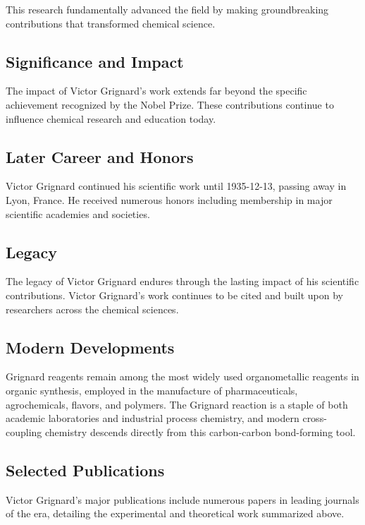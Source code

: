 This research fundamentally advanced the field by making groundbreaking contributions that transformed chemical science.

\subsection*{Significance and Impact}

The impact of Victor Grignard's work extends far beyond the specific achievement recognized by the Nobel Prize.
These contributions continue to influence chemical research and education today.

\subsection*{Later Career and Honors}

Victor Grignard continued his scientific work until 1935-12-13, passing away in Lyon, France.
He received numerous honors including membership in major scientific academies and societies.

\subsection*{Legacy}

The legacy of Victor Grignard endures through the lasting impact of his scientific contributions.
Victor Grignard's work continues to be cited and built upon by researchers across the chemical sciences.

\subsection*{Modern Developments}

Grignard reagents remain among the most widely used organometallic reagents in organic synthesis, employed in the manufacture of pharmaceuticals, agrochemicals, flavors, and polymers. The Grignard reaction is a staple of both academic laboratories and industrial process chemistry, and modern cross-coupling chemistry descends directly from this carbon-carbon bond-forming tool.

\subsection*{Selected Publications}

Victor Grignard's major publications include numerous papers in leading journals of the era, detailing the experimental and theoretical work summarized above.

